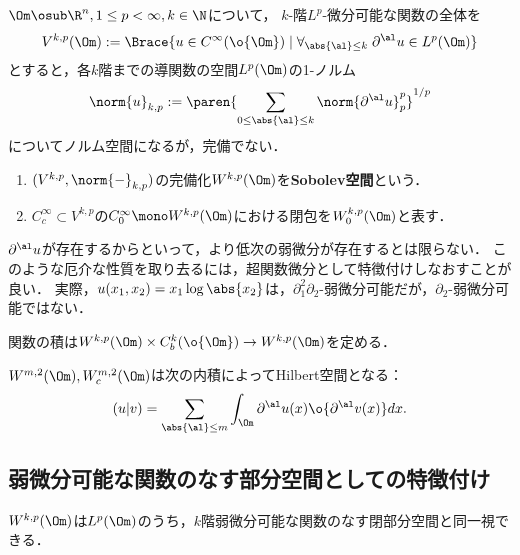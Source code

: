 \documentclass[uplatex, dvipdfmx]{jsreport}
\begin{document}
\begin{lemma}
    $\Om\osub\R^n,1\le p<\infty,k\in\N$について，
    $k$-階$L^p$-微分可能な関数の全体を
    \[V^{k,p}(\Om):=\Brace{u\in C^\infty(\o{\Om})\mid\forall_{\abs{\al}\le k}\;\partial^\al u\in L^p(\Om)}\]
    とすると，各$k$階までの導関数の空間$L^p(\Om)$の1-ノルム
    \[\norm{u}_{k,p}:=\paren{\sum_{0\le\abs{\al}\le k}\norm{\partial^\al u}_p^p}^{1/p}\]
    についてノルム空間になるが，完備でない．
\end{lemma}
\begin{definition}\mbox{}
    \begin{enumerate}
        \item $(V^{k,p},\norm{-}_{k,p})$の完備化$W^{k,p}(\Om)$を\textbf{Sobolev空間}という．
        \item $C_c^\infty\subset V^{k,p}$の$C_0^\infty\mono W^{k,p}(\Om)$における閉包を$W_0^{k,p}(\Om)$と表す．
    \end{enumerate}
\end{definition}
\begin{remark}
    $\partial^\al u$が存在するからといって，より低次の弱微分が存在するとは限らない．
    このような厄介な性質を取り去るには，超関数微分として特徴付けしなおすことが良い．
    実際，$u(x_1,x_2)=x_1\log\abs{x_2}$は，$\partial^2_1\partial_2$-弱微分可能だが，$\partial_2$-弱微分可能ではない．
\end{remark}

\begin{proposition}[関数の代数としての構造]
    関数の積は$W^{k,p}(\Om)\times C^k_b(\o{\Om})\to W^{k,p}(\Om)$を定める．
\end{proposition}

\begin{proposition}[Hilbert空間になるとき]
    $W^{m,2}(\Om),W^{m,2}_c(\Om)$は次の内積によってHilbert空間となる：
    \[(u|v)=\sum_{\abs{\al}\le m}\int_\Om\partial^\al u(x)\o{\partial^\al v(x)}dx.\]
\end{proposition}

\subsection{弱微分可能な関数のなす部分空間としての特徴付け}

\begin{tcolorbox}[colframe=ForestGreen, colback=ForestGreen!10!white,breakable,colbacktitle=ForestGreen!40!white,coltitle=black,fonttitle=\bfseries\sffamily,
title=]
    $W^{k,p}(\Om)$は$L^p(\Om)$のうち，$k$階弱微分可能な関数のなす閉部分空間と同一視できる．
\end{tcolorbox}
\end{document}
